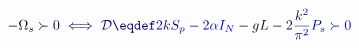 \documentclass[12pt]{article}
\begin{document}
\makeatletter
\renewcommand*{\@textcolor}[3]{%
  \protect\leavevmode
  \begingroup
    \color#1{#2}#3%
  \endgroup
}
\makeatother
\begin{displaymath}
\mathcolor[RGB]{0,0,15}{-} \mathcolor[RGB]{0,0,30}{\Omega} _ { \mathcolor[RGB]{0,0,45}{s} } \mathcolor[RGB]{0,0,60}{\succ} \mathcolor[RGB]{0,0,75}{0} \mathcolor[RGB]{0,0,90}{\iff} \mathcal { \mathcolor[RGB]{0,0,105}{D} } \mathcolor[RGB]{0,0,120}{\eqdef} \mathcolor[RGB]{0,0,135}{2} \mathcolor[RGB]{0,0,150}{k} \mathcolor[RGB]{0,0,165}{S} _ { \mathcolor[RGB]{0,0,180}{p} } \mathcolor[RGB]{0,0,195}{-} \mathcolor[RGB]{0,0,210}{2} \mathcolor[RGB]{0,0,225}{\alpha} \mathcolor[RGB]{0,0,240}{I} _ { \mathcolor[RGB]{0,0,255}{N} } \mathcolor[RGB]{0,15,0}{-} \mathcolor[RGB]{0,15,15}{g} \mathcolor[RGB]{0,15,30}{L} \mathcolor[RGB]{0,15,45}{-} \mathcolor[RGB]{0,15,60}{2} \mathcolor[RGB]{0,15,75}{\frac { \mathcolor[RGB]{0,15,90}{k} ^ { \mathcolor[RGB]{0,15,105}{2} } } { \mathcolor[RGB]{0,15,120}{\pi} ^ { \mathcolor[RGB]{0,15,135}{2} } } } \mathcolor[RGB]{0,15,150}{P} _ { \mathcolor[RGB]{0,15,165}{s} } \mathcolor[RGB]{0,15,180}{\succ} \mathcolor[RGB]{0,15,195}{0}
\end{displaymath}
\end{document}
